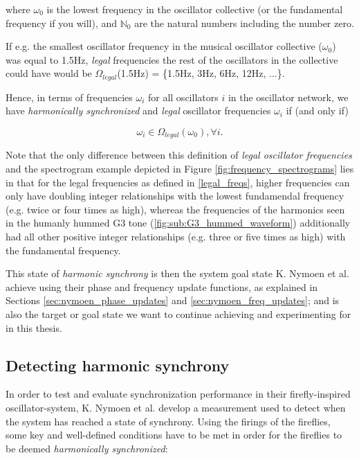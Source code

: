 where $\omega_{0}$ is the lowest frequency in the oscillator collective (or the fundamental frequency if you will), and $\mathbb{N}_0$ are the natural numbers including the number zero. \nl

If e.g. the smallest oscillator frequency in the musical oscillator collective ($\omega_0$) was equal to 1.5Hz, \textit{legal} frequencies the rest of the oscillators in the collective could have would be $\Omega_{legal}$(1.5Hz) = \{1.5Hz, 3Hz, 6Hz, 12Hz, ...\}.

Hence, in terms of frequencies $\omega_i$ for all oscillators $i$ in the oscillator network, we have \textit{harmonically synchronized} and \textit{legal} oscillator frequencies $\omega_i$ if (and only if)

\begin{equation}\label{synced_freqs}
\omega_i \in \Omega_{legal}(\omega_0) , \forall i.
\end{equation} \nl

Note that the only difference between this definition of \textit{legal oscillator frequencies} and the spectrogram example depicted in Figure \ref{fig:frequency_spectrograms} lies in that for the legal frequencies as defined in \eqref{legal_freqs}, higher frequencies can only have doubling integer relationships with the lowest fundamendal frequency (e.g. twice or four times as high), whereas the frequencies of the harmonics seen in the humanly hummed G3 tone (\ref{fig:sub:G3_hummed_waveform}) additionally had all other positive integer relationships (e.g. three or five times as high) with the fundamental frequency.

This state of \textit{harmonic synchrony} is then the system goal state K. Nymoen et al. achieve using their phase and frequency update functions, as explained in Sections \ref{sec:nymoen_phase_updates} and \ref{sec:nymoen_freq_updates}; and is also the target or goal state we want to continue achieving and experimenting for in this thesis.

	\subsection{Detecting harmonic synchrony}
	\label{baseline:subsec:detecting_harmonic_sync}
	In order to test and evaluate synchronization performance in their firefly-inspired oscillator-system, K. Nymoen et al. \cite{nymoen_synch} develop a measurement used to detect when the system has reached a state of synchrony. Using the firings of the fireflies, some key and well-defined conditions have to be met in order for the fireflies to be deemed \textit{harmonically synchronized}: \nl
	
